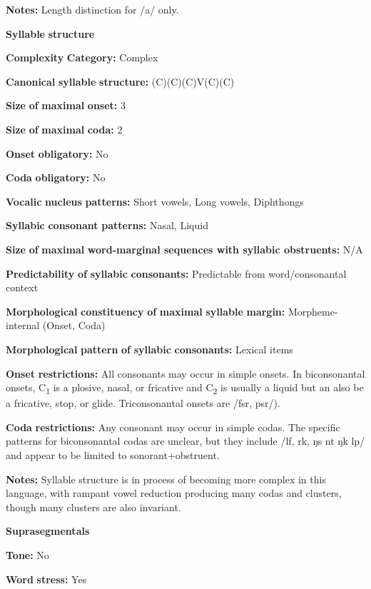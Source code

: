 \textbf{Notes:} Length distinction for /a/ only.

\textbf{Syllable} \textbf{structure}

\textbf{Complexity} \textbf{Category:} Complex

\textbf{Canonical} \textbf{syllable} \textbf{structure:} (C)(C)(C)V(C)(C) \citep[41-8]{Lacrampe2014}

\textbf{Size} \textbf{of} \textbf{maximal} \textbf{onset:} 3

\textbf{Size} \textbf{of} \textbf{maximal} \textbf{coda:} 2

\textbf{Onset} \textbf{obligatory:} No

\textbf{Coda} \textbf{obligatory:} No

\textbf{Vocalic} \textbf{nucleus} \textbf{patterns:} Short vowels, Long vowels, Diphthongs

\textbf{Syllabic} \textbf{consonant} \textbf{patterns:} Nasal, Liquid

\textbf{Size} \textbf{of} \textbf{maximal} \textbf{word{}-marginal sequences with syllabic obstruents:} N/A

\textbf{Predictability} \textbf{of} \textbf{syllabic} \textbf{consonants:} Predictable from word/consonantal context

\textbf{Morphological} \textbf{constituency} \textbf{of} \textbf{maximal} \textbf{syllable} \textbf{margin:} Morpheme-internal (Onset, Coda)

\textbf{Morphological} \textbf{pattern} \textbf{of} \textbf{syllabic} \textbf{consonants:} Lexical items

\textbf{Onset} \textbf{restrictions:} All consonants may occur in simple onsets. In biconsonantal onsets, C\textsubscript{1} is a plosive, nasal, or fricative and C\textsubscript{2} is usually a liquid but an also be a fricative, stop, or glide. Triconsonantal onsets are /fsr, psr/).

\textbf{Coda} \textbf{restrictions:} Any consonant may occur in simple codas. The specific patterns for biconsonantal codas are unclear, but they include /lf, rk, ŋs nt ŋk lp/ and appear to be limited to sonorant+obstruent.

\textbf{Notes:} Syllable structure is in process of becoming more complex in this language, with rampant vowel reduction producing many codas and clusters, though many clusters are also invariant.

\textbf{Suprasegmentals}

\textbf{Tone:} No

\textbf{Word} \textbf{stress:} Yes

